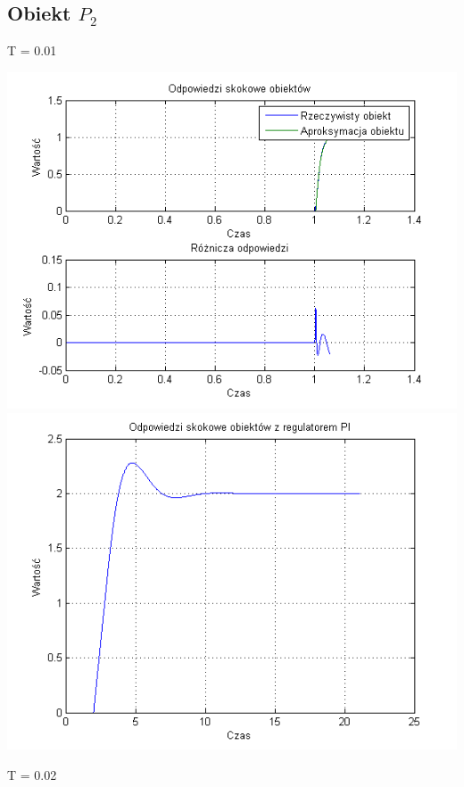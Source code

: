 \documentclass[10pt,a4paper]{article}
\begin{document}
\subsection{Obiekt $P_2$}
T = 0.01
\begin{center}
\includegraphics[scale=1]{images/jeden/skrypt_43.png}\\
\includegraphics[scale=1]{images/jeden/skrypt_44.png}\\
\end{center}
\newpage
T = 0.02
\end{document}
